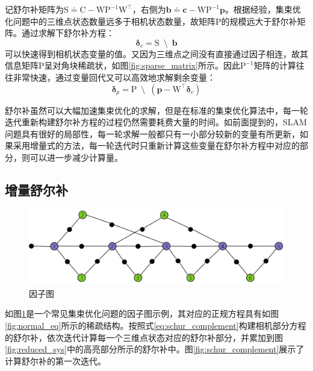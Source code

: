 记舒尔补矩阵为$\mathrm{S}\doteq\mathrm{C}-\mathrm{W}\mathrm{P}^{-1}\mathrm{W}^\top$，右侧为$\bm{b}\doteq\bm{c}-\mathrm{W}\mathrm{P}^{-1}\bm{p}$。根据经验，集束优化问题中的三维点状态数量远多于相机状态数量，故矩阵$\mathrm{P}$的规模远大于舒尔补矩阵。通过求解下舒尔补方程：
\begin{equation}
    \bm{\delta}_c = \mathrm{S} \enspace\setminus\enspace \bm{b}
    \label{eq:solve_schur}
\end{equation}
可以快速得到相机状态变量的值。又因为三维点之间没有直接通过因子相连，故其信息矩阵$\mathrm{P}$呈对角块稀疏状，如图\ref{fig:sparse_matrix}所示。因此$\mathrm{P}^{-1}$矩阵的计算往往非常快速，通过变量回代又可以高效地求解剩余变量：
\begin{equation}
    \bm{\delta}_p = \mathrm{P}
    \enspace\setminus\enspace
    \left( \bm{p}-\mathrm{W}^\top\bm{\delta}_c \right)
    \label{eq:back_sub}
\end{equation}

舒尔补虽然可以大幅加速集束优化的求解，但是在标准的集束优化算法中，每一轮迭代重新构建舒尔补方程的过程仍然需要耗费大量的时间。如前面提到的，SLAM问题具有很好的局部性，每一轮求解一般都只有一小部分较新的变量有所更新，如果采用增量式的方法，每一轮迭代时只重新计算这些变量在舒尔补方程中对应的部分，则可以进一步减少计算量。

\subsection{增量舒尔补}

\begin{figure}[htb!]
    \centering
    \includegraphics[width=.8\textwidth]{figs/factor_graph.png}
    \caption{因子图}
    \label{fig:factor_graph}
\end{figure}

如图\ref{fig:factor_graph}是一个常见集束优化问题的因子图示例，其对应的正规方程具有如图\ref{fig:normal_eq}所示的稀疏结构。按照式\eqref{eq:schur_complement}构建相机部分方程的舒尔补，依次迭代计算每一个三维点状态对应的舒尔补部分，并累加到图\ref{fig:reduced_sys}中的高亮部分所示的舒尔补中。图\ref{fig:schur_complement}展示了计算舒尔补的第一次迭代。

